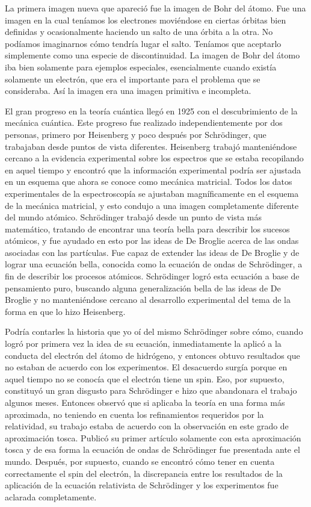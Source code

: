 \documentclass[a4paper, 12pt]{article}
\begin{document}
La primera imagen nueva que apareció fue la imagen de Bohr del átomo. Fue una imagen en la cual teníamos los electrones moviéndose en ciertas órbitas bien definidas y ocasionalmente haciendo un salto de una órbita a la otra. No podíamos imaginarnos cómo tendría lugar el salto. Teníamos que aceptarlo simplemente como una especie de discontinuidad. La imagen de Bohr del átomo iba bien solamente para ejemplos especiales, esencialmente cuando existía solamente un electrón, que era el importante para el problema que se consideraba. Así la imagen era una imagen primitiva e incompleta.

El gran progreso en la teoría cuántica llegó en 1925 con el descubrimiento de la mecánica cuántica. Este progreso fue realizado independientemente por dos personas, primero por Heisenberg y poco después por Schrödinger, que trabajaban desde puntos de vista diferentes. Heisenberg trabajó manteniéndose cercano a la evidencia experimental sobre los espectros que se estaba recopilando en aquel tiempo y encontró que la información experimental podría ser ajustada en un esquema que ahora se conoce como mecánica matricial. Todos los datos experimentales de la espectroscopía se ajustaban magníficamente en el esquema de la mecánica matricial, y esto condujo a una imagen completamente diferente del mundo atómico. Schrödinger trabajó desde un punto de vista más matemático, tratando de encontrar una teoría bella para describir los sucesos atómicos, y fue ayudado en esto por las ideas de De Broglie acerca de las ondas asociadas con las partículas. Fue capaz de extender las ideas de De Broglie y de lograr una ecuación bella, conocida como la ecuación de ondas de Schrödinger, a fin de describir los procesos atómicos. Schrödinger logró esta ecuación a base de  pensamiento puro, buscando alguna generalización bella de las ideas de De Broglie y no manteniéndose cercano al desarrollo experimental del tema de la forma en que lo hizo Heisenberg.

Podría contarles la historia que yo oí del mismo Schrödinger sobre cómo, cuando logró por primera vez la idea de su ecuación, inmediatamente la aplicó a la conducta del electrón del átomo de hidrógeno, y entonces obtuvo resultados que no estaban de acuerdo con los experimentos. El desacuerdo surgía porque en aquel tiempo no se conocía que el electrón tiene un spin. Eso, por supuesto, constituyó un gran disgusto para Schrödinger e hizo que abandonara el trabajo algunos meses. Entonces observó que si aplicaba la teoría en una forma más aproximada, no teniendo en cuenta los refinamientos requeridos por la relatividad, su trabajo estaba de acuerdo con la observación en este grado de aproximación tosca. Publicó su primer artículo solamente con esta aproximación tosca y de esa forma la ecuación de ondas de Schrödinger fue presentada ante el mundo. Después, por supuesto, cuando se encontró cómo tener en cuenta correctamente el spin del electrón, la discrepancia entre los resultados de la aplicación de la ecuación relativista de Schrödinger y los experimentos fue aclarada completamente.
\end{document}
